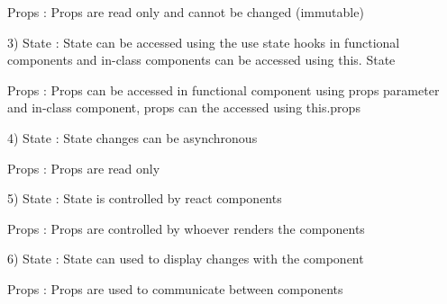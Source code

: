 Props : Props are read only and cannot be changed (immutable)

3)
State : State can be accessed using the use state hooks in functional 
        components and in-class components can be accessed using this. State

Props : Props can be accessed in functional component using props 
        parameter and in-class component, 
        props can the accessed using this.props

4)
State : State changes can be asynchronous

Props : Props are read only

5)
State : State is controlled by react components

Props : Props are controlled by whoever renders the components

6)
State : State can used to display changes with the component

Props : Props are used to communicate between components